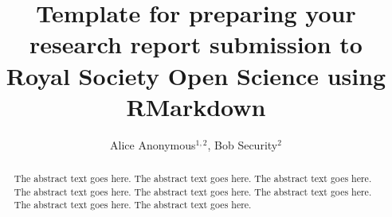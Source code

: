 \documentclass[]{rsos}%
\begin{document}
\title{Template for preparing your research report submission to Royal Society Open Science using RMarkdown}

\author{
Alice Anonymous$^{1,2}$,
Bob Security$^{2}$}

\address{
  $^{1}$Some Institute of Technology, Department, Street, City, State, Zip\\
  $^{2}$Another University Department, Street, City, State, Zip}
\subject{
subject 1,
subject 2,
subject 3}



\begin{abstract}
The abstract text goes here. The abstract text goes here. The abstract text goes here. The abstract text goes here. The abstract text goes here. The abstract text goes here. The abstract text goes here. The abstract text goes here.
\end{abstract}

\providecommand{\tightlist}{%
  \setlength{\itemsep}{0pt}\setlength{\parskip}{0pt}}
\providecommand{\EndFirstPage}{%
}
\end{document}
